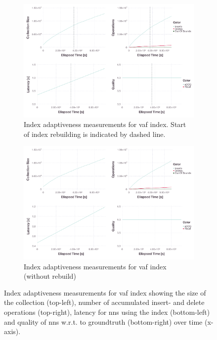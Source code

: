 \begin{figure}[p]
    \centering
    \begin{subfigure}[b]{\textwidth}
        \centering
        \includegraphics[width=\textwidth]{figures/index/index-vaf-adaptiveness-with-rebuild}
        \caption{Index adaptiveness measurements for \acrshort{vaf} index. Start of index rebuilding is indicated by dashed line.}
        \label{figure:index_adaptiveness_vaf_rebuild}
    \end{subfigure}
    \hfill
    \centering
    \begin{subfigure}[b]{\textwidth}
        \centering
        \includegraphics[width=\textwidth]{figures/index/index-vaf-adaptiveness-no-rebuild}
        \caption{Index adaptiveness measurements for \acrshort{vaf} index (without rebuild)}
        \label{figure:index_adaptiveness_vaf_no_rebuild}
    \end{subfigure}
    \caption{Index adaptiveness measurements for \acrshort{vaf} index showing the size of the collection (top-left), number of accumulated insert- and delete operations (top-right), latency for \acrshort{nns} using the index (bottom-left) and quality of \acrshort{nns} w.r.t. to groundtruth (bottom-right) over time (x-axis).}
    \label{figure:index_adaptiveness_vaf}
\end{figure}

